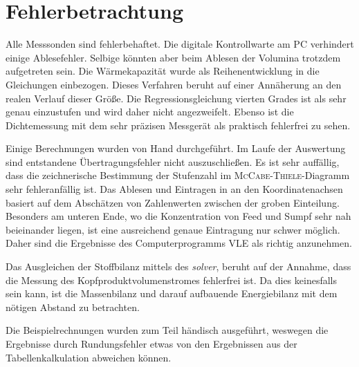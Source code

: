 \section{Fehlerbetrachtung}
\label{sec:fehler}

Alle Messsonden sind fehlerbehaftet. Die digitale Kontrollwarte am PC verhindert einige Ablesefehler. Selbige könnten aber beim Ablesen der Volumina trotzdem aufgetreten sein. Die Wärmekapazität wurde als Reihenentwicklung in die Gleichungen einbezogen. Dieses Verfahren beruht auf einer Annäherung an den realen Verlauf dieser Größe. Die Regressionsgleichung vierten Grades ist als sehr genau einzustufen und wird daher nicht angezweifelt. Ebenso ist die Dichtemessung mit dem sehr präzisen Messgerät als praktisch fehlerfrei zu sehen.

Einige Berechnungen wurden von Hand durchgeführt. Im Laufe der Auswertung sind entstandene Übertragungsfehler nicht auszuschließen. Es ist sehr auffällig, dass die zeichnerische Bestimmung der Stufenzahl im \textsc{McCabe}-\textsc{Thiele}-Diagramm sehr fehleranfällig ist. Das Ablesen und Eintragen in an den Koordinatenachsen basiert auf dem Abschätzen von Zahlenwerten zwischen der groben Einteilung. Besonders am unteren Ende, wo die Konzentration von Feed und Sumpf sehr nah beieinander liegen, ist eine ausreichend genaue Eintragung nur schwer möglich. Daher sind die Ergebnisse des Computerprogramms VLE als richtig anzunehmen.


Das Ausgleichen der Stoffbilanz mittels des \emph{solver}, beruht auf der Annahme, dass die Messung des Kopfproduktvolumenstromes fehlerfrei ist. Da dies keinesfalls sein kann, ist die Massenbilanz und darauf aufbauende Energiebilanz mit dem nötigen Abstand zu betrachten.

Die Beispielrechnungen wurden zum Teil händisch ausgeführt, weswegen die Ergebnisse durch Rundungsfehler etwas von den Ergebnissen aus der Tabellenkalkulation abweichen können.